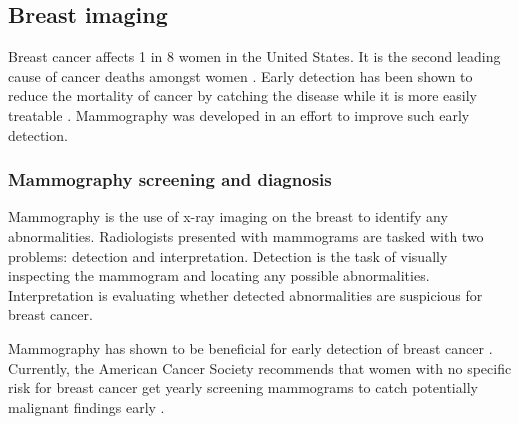 \subsection{Breast imaging}
Breast cancer affects 1 in 8 women in the United States. It is the second leading cause of cancer deaths amongst women \cite{Siegel:2012kt}. Early detection has been shown to reduce the mortality of cancer by catching the disease while it is more easily treatable \cite{Baker:1982jg}. Mammography was developed in an effort to improve such early detection.

\subsubsection{Mammography screening and diagnosis}
Mammography is the use of x-ray imaging on the breast to identify any abnormalities. Radiologists presented with mammograms are tasked with two problems: detection and interpretation. Detection is the task of visually inspecting the mammogram and locating any possible abnormalities. Interpretation is evaluating whether detected abnormalities are suspicious for breast cancer.

Mammography has shown to be beneficial for early detection of breast cancer \cite{Nystrom:2002hb}. Currently, the American Cancer Society recommends that women with no specific risk for breast cancer get yearly screening mammograms to catch potentially malignant findings early \cite{Smith:2003en}.

